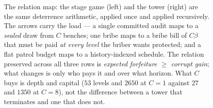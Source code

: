 \begin{figure}[htbp]
{%
}
\caption{The relation map: the stage game (left) and the tower (right) are the same deterrence arithmetic, applied once and applied recursively. The arrows carry the load --- a single committed audit maps to a \emph{sealed} draw from $C$ benches; one bribe maps to a bribe bill of $C\beta$ that must be paid \emph{at every level} the briber wants protected; and a flat patrol budget maps to a history-indexed schedule. The relation preserved across all three rows is \emph{expected forfeiture $\ge$ corrupt gain}; what changes is only who pays it and over what horizon. What $C$ buys is depth and capital ($53$ levels and $2650$ at $C{=}1$ against $27$ and $1350$ at $C{=}8$), not the difference between a tower that terminates and one that does not.}
\label{fig:relation}
\end{figure}
